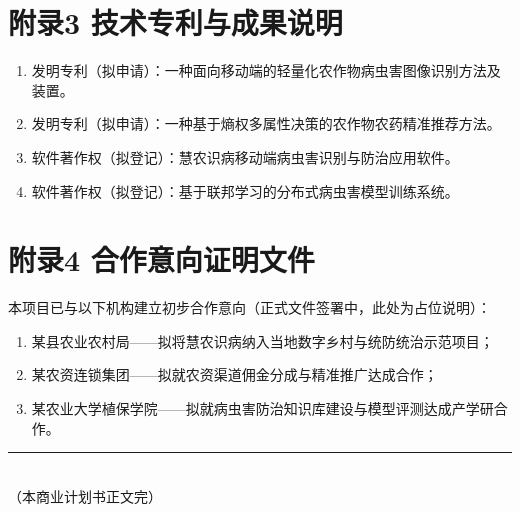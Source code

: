 \section{附录3 技术专利与成果说明}

\begin{enumerate}[leftmargin=1.6em]
  \item 发明专利（拟申请）：一种面向移动端的轻量化农作物病虫害图像识别方法及装置。
  \item 发明专利（拟申请）：一种基于熵权多属性决策的农作物农药精准推荐方法。
  \item 软件著作权（拟登记）：慧农识病移动端病虫害识别与防治应用软件。
  \item 软件著作权（拟登记）：基于联邦学习的分布式病虫害模型训练系统。
\end{enumerate}

\section{附录4 合作意向证明文件}

本项目已与以下机构建立初步合作意向（正式文件签署中，此处为占位说明）：

\begin{enumerate}[leftmargin=1.6em]
  \item 某县农业农村局——拟将慧农识病纳入当地数字乡村与统防统治示范项目；
  \item 某农资连锁集团——拟就农资渠道佣金分成与精准推广达成合作；
  \item 某农业大学植保学院——拟就病虫害防治知识库建设与模型评测达成产学研合作。
\end{enumerate}

\begin{center}
  \vspace{1em}
  \color{grayline}\rule{0.6\linewidth}{0.4pt}\\[0.5em]
  {\small （本商业计划书正文完）}
\end{center}
